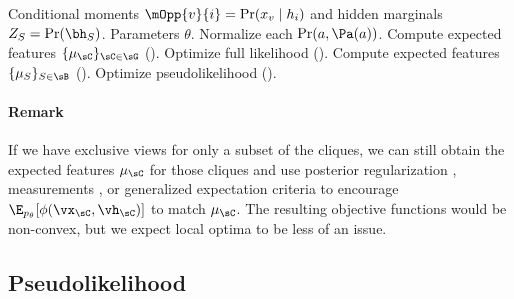 \begin{algorithm}
  \caption{\LearnParameters}
  \label{algo:undirected}
  \begin{algorithmic}
    \REQUIRE Conditional moments $\mOpp{v}{i} = \Pr(x_v \mid h_i)$
             and hidden marginals $Z_S = \Pr(\bh_S)$.
    \ENSURE Parameters $\theta$.
     \STATE Normalize each $\Pr(a,\Pa(a))$. 
      \STATE Compute expected features $\{\mu_\sC\}_{\sC \in \sG}$ ().
      \STATE Optimize full likelihood ().
      \STATE Compute expected features $\{\mu_S\}_{S \in \sB}$ ().
      \STATE Optimize pseudolikelihood ().
    \ENDIF
    \end{algorithmic}
\end{algorithm}

\paragraph{Remark} If we have exclusive views for only a subset of the cliques,
we can still obtain the expected features $\mu_\sC$ for those cliques
  and use posterior regularization \citep{graca08em}, measurements \citep{liang09measurements}, or generalized
  expectation criteria \citep{mann08ge}
  to encourage $\E_{p_\theta}[\phi(\vx_\sC,\vh_\sC)]$ to match $\mu_\sC$.
The resulting objective functions would be non-convex, but we expect
  local optima to be less of an issue.

\subsection{Pseudolikelihood}
\label{sec:pseudolikelihood}

